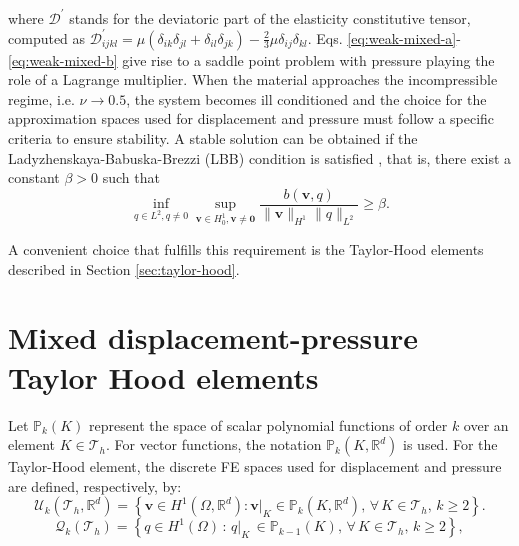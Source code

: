 \documentclass[english,11pt,3p,number,sort&compress]{elsarticle}
\begin{document}
\noindent where $\mathcal{D}^{'}$ stands for the deviatoric part of the elasticity constitutive tensor, computed as $\mathcal{D}^{'}_{ijkl} = \mu(\delta_{ik}\delta_{jl}+\delta_{il}\delta_{jk})-\frac{2}{3}\mu\delta_{ij}\delta_{kl}$. Eqs. \eqref{eq:weak-mixed-a}-\eqref{eq:weak-mixed-b} give rise to a saddle point problem with pressure playing the role of a Lagrange multiplier. When the material approaches the incompressible regime, i.e. $\nu \rightarrow 0.5$, the system becomes ill conditioned and the choice for the approximation spaces used for displacement and pressure must follow a specific criteria to ensure stability. A stable solution can be obtained if the Ladyzhenskaya-Babuska-Brezzi (LBB) condition is satisfied \cite{brezzi2012mixed}, that is, there exist a constant $\beta>0$ such that
\begin{equation} \label{eq:LBB}
	\inf_{q \in L^2,q\neq0} \sup_{\bm{v} \in H^1_0,\bm{v}\neq\bm{0}} \frac{b\left(\bm{v},q\right)}{\|\bm{v}\|_{H^1} \|q\|_{L^2}} \geq \beta .
\end{equation}

\noindent A convenient choice that fulfills this requirement is the Taylor-Hood elements \cite{taylor1973numerical} described in Section \ref{sec:taylor-hood}.

\section{Mixed displacement-pressure Taylor Hood elements \label{sec:taylor-hood}}

Let $\mathbb{P}_k(K)$ represent the space of scalar polynomial functions of order $k$ over an element $K\in\mathcal{T}_h$. For vector functions, the notation $\mathbb{P}_k(K,\mathbb{R}^d)$ is used. For the Taylor-Hood element, the discrete FE spaces used for displacement and pressure are defined, respectively, by:
\begin{equation}
    \label{eq:uTH}
    \mathcal{U}_k(\mathcal{T}_h,\mathbb{R}^d) = \left\{\bm{v} \in H^1(\Omega,\mathbb{R}^d) : \bm{v}\lvert_{K} \in \mathbb{P}_k(K,\mathbb{R}^d), \,\forall \,K \in \mathcal{T}_h, \, k\geq 2 \right\}.
\end{equation}
\begin{equation}
    \label{eq:qTH}
    \mathcal{Q}_k(\mathcal{T}_h) = \left\{q \in H^1(\Omega) \,:\, q\lvert_{K} \, \in \mathbb{P}_{k-1}(K), \,\forall \, K \in \mathcal{T}_h, \, k\geq 2\right\},
\end{equation}
\end{document}
